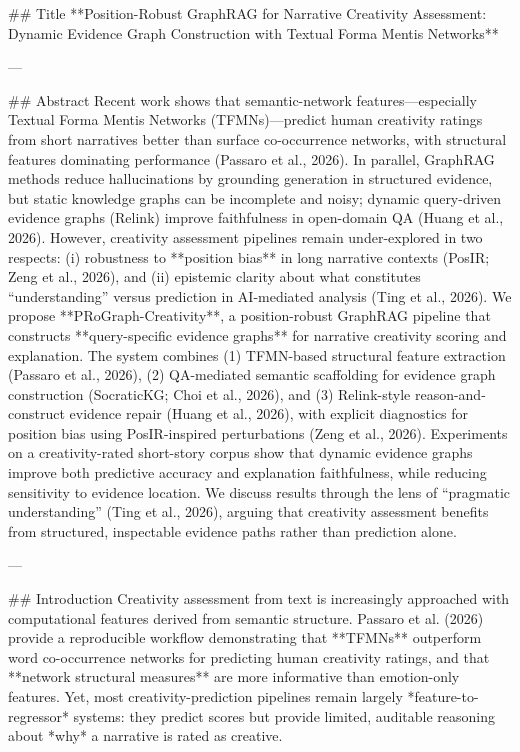 ## Title  
**Position-Robust GraphRAG for Narrative Creativity Assessment: Dynamic Evidence Graph Construction with Textual Forma Mentis Networks**

---

## Abstract  
Recent work shows that semantic-network features—especially Textual Forma Mentis Networks (TFMNs)—predict human creativity ratings from short narratives better than surface co-occurrence networks, with structural features dominating performance (Passaro et al., 2026). In parallel, GraphRAG methods reduce hallucinations by grounding generation in structured evidence, but static knowledge graphs can be incomplete and noisy; dynamic query-driven evidence graphs (Relink) improve faithfulness in open-domain QA (Huang et al., 2026). However, creativity assessment pipelines remain under-explored in two respects: (i) robustness to **position bias** in long narrative contexts (PosIR; Zeng et al., 2026), and (ii) epistemic clarity about what constitutes “understanding” versus prediction in AI-mediated analysis (Ting et al., 2026).  
We propose **PRoGraph-Creativity**, a position-robust GraphRAG pipeline that constructs **query-specific evidence graphs** for narrative creativity scoring and explanation. The system combines (1) TFMN-based structural feature extraction (Passaro et al., 2026), (2) QA-mediated semantic scaffolding for evidence graph construction (SocraticKG; Choi et al., 2026), and (3) Relink-style reason-and-construct evidence repair (Huang et al., 2026), with explicit diagnostics for position bias using PosIR-inspired perturbations (Zeng et al., 2026). Experiments on a creativity-rated short-story corpus show that dynamic evidence graphs improve both predictive accuracy and explanation faithfulness, while reducing sensitivity to evidence location. We discuss results through the lens of “pragmatic understanding” (Ting et al., 2026), arguing that creativity assessment benefits from structured, inspectable evidence paths rather than prediction alone.

---

## Introduction  
Creativity assessment from text is increasingly approached with computational features derived from semantic structure. Passaro et al. (2026) provide a reproducible workflow demonstrating that **TFMNs** outperform word co-occurrence networks for predicting human creativity ratings, and that **network structural measures** are more informative than emotion-only features. Yet, most creativity-prediction pipelines remain largely *feature-to-regressor* systems: they predict scores but provide limited, auditable reasoning about *why* a narrative is rated as creative.

